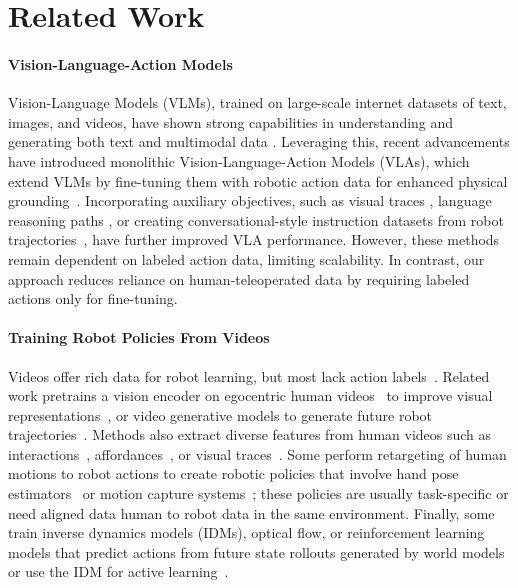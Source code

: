 \documentclass{article} %
\begin{document}
\section{Related Work}
\paragraph{Vision-Language-Action Models}
Vision-Language Models (VLMs), trained on large-scale internet datasets of text, images, and videos, have shown strong capabilities in understanding and generating both text and multimodal data \citep{liu2023visual, chameleonteam2024chameleonmixedmodalearlyfusionfoundation, liu2024worldmodelmillionlengthvideo,abdin2024phi}. Leveraging this, recent advancements have introduced monolithic Vision-Language-Action Models (VLAs), which extend VLMs by fine-tuning them with robotic action data for enhanced physical grounding~\citep{brohan2023rt, kim2024OpenVLA, team2024octo, open_x_embodiment_rt_x_2023}. Incorporating auxiliary objectives, such as visual traces \citep{niu2024llarva}, language reasoning paths \citep{michal2024robotic}, or creating conversational-style instruction datasets from robot trajectories~\citep{li2024llara}, have further improved VLA performance. However, these methods remain dependent on labeled action data, limiting scalability. In contrast, our approach reduces reliance on human-teleoperated data by requiring labeled actions only for fine-tuning.

\paragraph{Training Robot Policies From Videos}

Videos offer rich data for robot learning, but most lack action labels~\citep{mccarthy2024generalistrobotlearninginternet}. Related work pretrains a vision encoder on egocentric human videos~\citep{grauman2022ego4d} to improve visual representations~\citep{nair2022r3m, dasari2023unbiased}, or video generative models to generate future robot trajectories{~\citep{wu2024unleashing, liang2024dreamitate, helearning}}. Methods also extract diverse features from human videos such as interactions~\citep{zeng2024learning}, affordances~\citep{bahl2023affordances, kannan2023deft, srirama2024hrp, shaw2023videodex}, or visual traces~\citep{wen2023any, bharadhwaj2024track2act}. Some perform retargeting of human motions to robot actions to create robotic policies that involve hand pose estimators~\citep{wang2023mimicplay, zhu2024vision, shaw2023videodex, bharadhwaj2023zero, ye2023learning, qin2022dexmv} or motion capture systems~\citep{yang2024equibot}; these policies are usually task-specific or need aligned data human to robot data in the same environment. Finally, some train inverse dynamics models (IDMs), optical flow, or reinforcement learning models that predict actions from future state rollouts generated by world models~\citep{du2023learning, ko2024learning, yang2024learning, bharadhwaj2024gen2act} or use the IDM for active learning~\citep{NEURIPS2022_9c7008af}.
\end{document}

